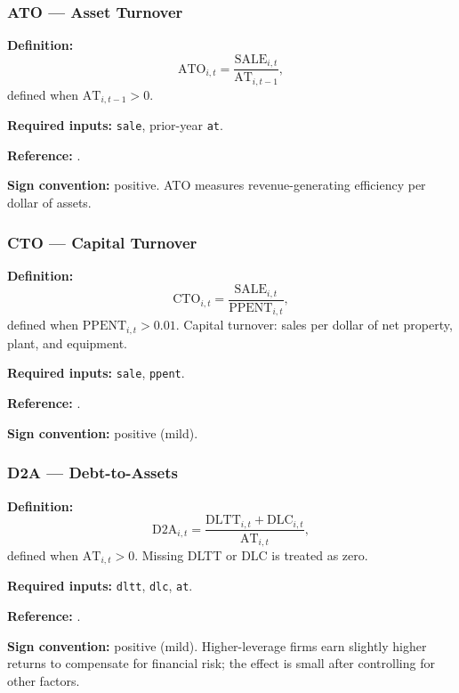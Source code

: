 \subsubsection{ATO --- Asset Turnover}

\textbf{Definition:}
\begin{equation}
\mathrm{ATO}_{i,t} = \frac{\mathrm{SALE}_{i,t}}{\mathrm{AT}_{i,t-1}},
\label{eq:ato}
\end{equation}
defined when $\mathrm{AT}_{i,t-1} > 0$.

\textbf{Required inputs:} \texttt{sale}, prior-year \texttt{at}.

\textbf{Reference:} \cite{SoliFridson1995}.

\textbf{Sign convention:} positive. ATO measures revenue-generating
efficiency per dollar of assets.

\subsubsection{CTO --- Capital Turnover}

\textbf{Definition:}
\begin{equation}
\mathrm{CTO}_{i,t} = \frac{\mathrm{SALE}_{i,t}}{\mathrm{PPENT}_{i,t}},
\label{eq:cto}
\end{equation}
defined when $\mathrm{PPENT}_{i,t} > 0.01$. Capital turnover: sales
per dollar of net property, plant, and equipment.

\textbf{Required inputs:} \texttt{sale}, \texttt{ppent}.

\textbf{Reference:} \cite{Haugen1996}.

\textbf{Sign convention:} positive (mild).

\subsubsection{D2A --- Debt-to-Assets}

\textbf{Definition:}
\begin{equation}
\mathrm{D2A}_{i,t} = \frac{\mathrm{DLTT}_{i,t} + \mathrm{DLC}_{i,t}}
                          {\mathrm{AT}_{i,t}},
\label{eq:d2a}
\end{equation}
defined when $\mathrm{AT}_{i,t} > 0$. Missing DLTT or DLC is treated as
zero.

\textbf{Required inputs:} \texttt{dltt}, \texttt{dlc}, \texttt{at}.

\textbf{Reference:} \cite{Bhandari1988,FamaFrench1992}.

\textbf{Sign convention:} positive (mild). Higher-leverage firms earn
slightly higher returns to compensate for financial risk; the effect
is small after controlling for other factors.

